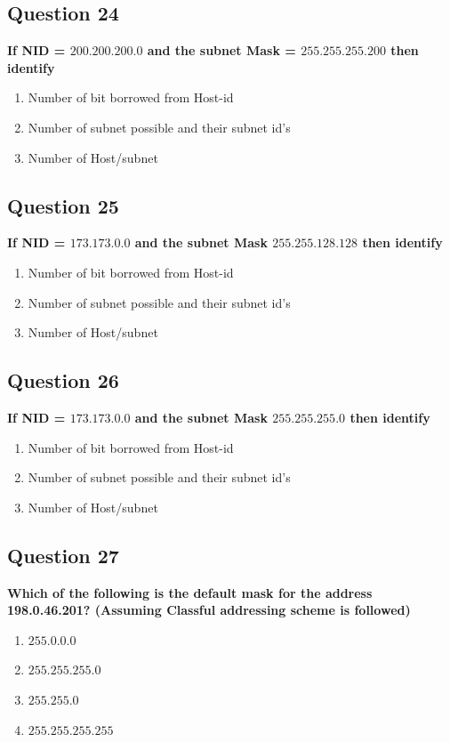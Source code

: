 \documentclass[12pt]{article}
\begin{document}
\subsection*{Question 24}
\textbf{If NID = $200.200.200.0$ and the subnet Mask = $255.255.255.200$ then identify}
\begin{enumerate}[label = (\Roman*.)]
    \item Number of bit borrowed from Host-id
    \item Number of subnet possible and their subnet id's
    \item Number of Host/subnet
\end{enumerate}

\subsection*{Question 25}
\textbf{If NID = $173.173.0.0$ and the subnet Mask $255.255.128.128$ then identify}
\begin{enumerate}[label = (\Roman*.)]
    \item Number of bit borrowed from Host-id
    \item Number of subnet possible and their subnet id's
    \item Number of Host/subnet
\end{enumerate}

\subsection*{Question 26}
\textbf{If NID = $173.173.0.0$ and the subnet Mask $255.255.255.0$ then identify}
\begin{enumerate}[label = (\Roman*.)]
    \item Number of bit borrowed from Host-id
    \item Number of subnet possible and their subnet id's
    \item Number of Host/subnet
\end{enumerate}

\subsection*{Question 27}
\textbf{Which of the following is the default mask for the address 198.0.46.201? (Assuming Classful addressing scheme is followed)}
\begin{enumerate}
    \item $255.0.0.0$
    \item $255.255.255.0$
    \item $255.255.0$
    \item $255.255.255.255$
\end{enumerate}
\end{document}
